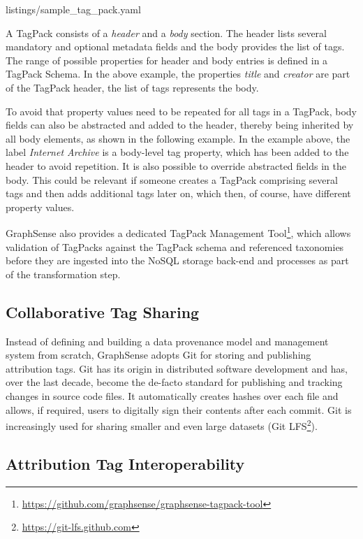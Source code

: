 \lstset{style=mystyle}

	{listings/sample_tag_pack.yaml}

A TagPack consists of a \emph{header} and a \emph{body} section. The header lists several mandatory and optional metadata fields and the body provides the list of tags. The range of possible properties for header and body entries is defined in a TagPack Schema. In the above example, the properties \emph{title} and \emph{creator} are part of the TagPack header, the list of tags represents the body.

To avoid that property values need to be repeated for all tags in a TagPack, body fields can also be abstracted and added to the header, thereby being inherited by all body elements, as shown in the following example. In the example above, the label \emph{Internet Archive} is a body-level tag property, which has been added to the header to avoid repetition. It is also possible to override abstracted fields in the body. This could be relevant if someone creates a TagPack comprising several tags and then adds additional tags later on, which then, of course, have different property values.

GraphSense also provides a dedicated TagPack Management Tool\footnote{\url{https://github.com/graphsense/graphsense-tagpack-tool}}, which allows validation of TagPacks against the TagPack schema and referenced taxonomies before they are ingested into the NoSQL storage back-end and processes as part of the transformation step.

\subsection{Collaborative Tag Sharing}

Instead of defining and building a data provenance model and management system from scratch, GraphSense adopts Git for storing and publishing attribution tags. Git has its origin in distributed software development and has, over the last decade, become the de-facto standard for publishing and tracking changes in source code files. It automatically creates hashes over each file and allows, if required, users to digitally sign their contents after each commit. Git is increasingly used for sharing smaller and even large datasets (Git LFS\footnote{\url{https://git-lfs.github.com}}).

\subsection{Attribution Tag Interoperability}

